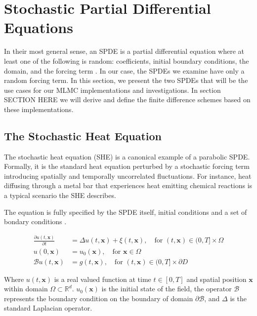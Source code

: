 \section{Stochastic Partial Differential Equations}

In their most general sense, an SPDE is a partial differential equation
where at least one of the following is random: coefficients, 
initial boundary conditions, the domain, and the forcing term 
\cite{lototsky2017stochastic}. In our case, 
the SPDEs we examine have only a random forcing term. 
In this section, we present the two SPDEs that will be
the use cases for our MLMC implementations and investigations.
In section SECTION HERE we will derive and define the finite difference schemes
based on these implementations.


\subsection{The Stochastic Heat Equation}

The stochastic heat equation (SHE) is a canonical example of a parabolic SPDE.
Formally, it is the standard heat equation perturbed by a stochastic
forcing term introducing spatially and temporally uncorrelated 
fluctuations. For instance, heat diffusing through a metal bar 
that experiences heat emitting chemical reactions is a typical scenario the SHE
describes.

The equation is fully specified by the SPDE itself, initial conditions and 
a set of bondary conditions \cite{lototsky2017stochastic,pardoux2021stochastic}.

\begin{align}\label{eq:she_spde}
\frac{\partial u(t,\mathbf{x})}{\partial t} &= \Delta u(t,\mathbf{x}) + \xi(t,\mathbf{x}), \quad \text{for } (t, \mathbf{x}) \in (0, T] \times \Omega \tag{SHE} \\
u(0, \mathbf{x}) &= u_0(\mathbf{x}), \quad \text{for } \mathbf{x} \in \Omega \nonumber \\
\mathcal{B}u(t, \mathbf{x}) &= g(t, \mathbf{x}), \quad \text{for } (t, \mathbf{x}) \in (0, T] \times \partial D \nonumber
\end{align}

Where $u(t,\mathbf{x})$ is a real valued function at time $t \in [0, T]$ and 
spatial position $\mathbf{x}$ within domain $\Omega \subset \mathbb{R}^d$. 
$u_0(\mathbf{x})$ is the initial state of the field,
the operator $\mathcal{B}$ represents the boundary condition on the boundary of domain 
$\partial \mathcal{B}$, and $\Delta$ is the standard Laplacian operator.

